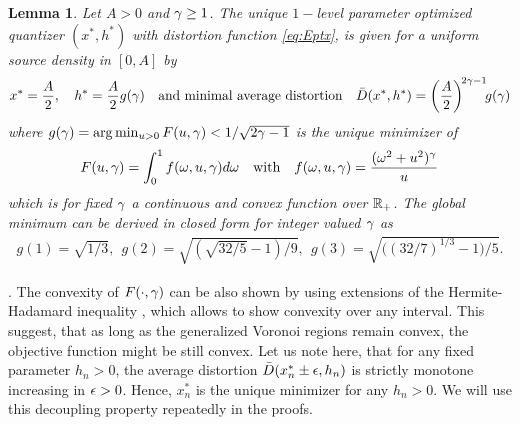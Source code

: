 \documentclass[smallabstract,smallcaptions]{dccpaper}
\newtheorem{lemma}{Lemma}
\newif\ifarxiv\arxivfalse
\newenvironment{remark}{\par\vspace{1.5ex}\noindent{\em Remark\/}.}{\par\vspace{1.5ex}}
\newcommand{\Dis}{\ensuremath{D}}                    %
\newcommand{\AvDis}{\ensuremath{\bar{\Dis}}}         %
\begin{document}
\begin{lemma}\label{lem:ggam}
  Let $A>0$ and $\gamma\geq 1$. The unique $1-$level parameter optimized quantizer $(x^*,h^*)$ with distortion
  function \eqref{eq:Eptx}, is given  for a uniform source
  density in $[0,A]$ by
  \begin{align}
    x^*=\frac{A}{2},\quad   h^*=\frac{A}{2} g(\gam) \quad\text{and minimal average distortion} \quad
    \AvDis(x^*,h^*)=\left(\frac{A}{2}\right)^{\!2\gam-1}\!\!g(\gam)\notag
  \end{align}
  where  $g(\gamma)=\arg\min_{u>0} F(u,\gamma)<1/\sqrt{2\gamma-1}$ is the unique minimizer of 
  \begin{align}
    F(u,\gamma)=\int_0^1  f(\omega,u,\gamma) d\omega \quad\text{with}\quad f(\omega,u,\gamma)=\frac{(\omega^2+u^2)^{\gamma}}{u} 
  \end{align}
  which is for fixed $\gamma$ a continuous and convex function over ${\mathbb R}_+$. The global minimum can be derived in closed form for integer valued $\gamma$ as 
  \begin{align}
    g(1) = \sqrt{1/3},\ \  g(2) = \sqrt{ (\sqrt{32/5}-1)/9}, 
    \ \  g(3) = \sqrt{\Big((32/7)^{1/3}-1\Big)/5}.\label{eq:ggam}
  \end{align}
\end{lemma}
%
\ifarxiv 
\begin{proof}
See \appref{app:proof_lemma_ggam}.
\end{proof}
\fi


\begin{remark}
  The convexity of $F(\cdot,\gamma)$ can be also shown by using extensions of the Hermite-Hadamard inequality \cite{ZC10},
  which allows to show convexity over any interval. This suggest, that as long as the generalized Voronoi regions remain
  convex, the objective function might be still convex.
  Let us note here, that for any fixed parameter $h_n>0$, the average distortion $\AvDis(x_n^*\pm \eps,h_n)$ is strictly
  monotone increasing in $\epsilon>0$. Hence, $x_n^*$ is the unique minimizer for any $h_n>0$. We will use this decoupling
  property repeatedly in the proofs. 
\end{remark}
\end{document}

